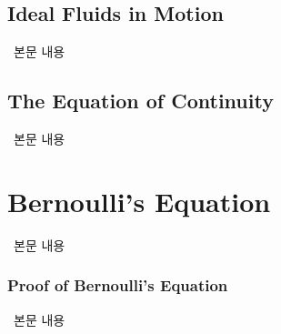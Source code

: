 \subsection{Ideal Fluids in Motion}
%
\ 본문 내용

\subsection{The Equation of Continuity}
%
\ 본문 내용

\section{Bernoulli's Equation}
%
\ 본문 내용

\subsubsection{Proof of Bernoulli’s Equation}
%
\ 본문 내용